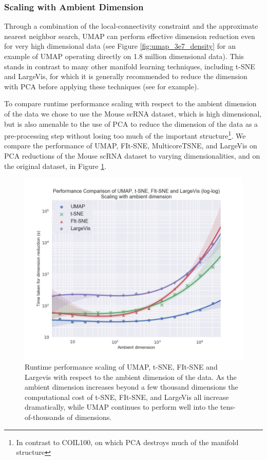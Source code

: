 \documentclass[12pt]{article}
\begin{document}
\subsubsection{Scaling with Ambient Dimension}\label{ambient_dim_scaling}

Through a combination of the local-connectivity constraint and the approximate nearest neighbor search, UMAP can perform effective dimension reduction even for very high dimensional data (see Figure \ref{fig:umap_3e7_density} for an example of UMAP operating directly on 1.8 million dimensional data). This stands in contrast to many other manifold learning techniques, including t-SNE and LargeVis, for which it is generally recommended to reduce the dimension with PCA before applying these techniques (see \cite{maaten2008visualizing} for example).

To compare runtime performance scaling with respect to the ambient dimension of the data we chose to use the Mouse scRNA dataset, which is high dimensional, but is also amenable to the use of PCA to reduce the dimension of the data as a pre-processing step without losing too much of the important structure\footnote{In contrast to COIL100, on which PCA destroys much of the manifold structure}. We compare the performance of UMAP, FIt-SNE, MulticoreTSNE, and LargeVis on PCA reductions of the Mouse scRNA dataset to varying dimensionalities, and on the original dataset, in Figure \ref{fig:ambient-dim-scaling}. 

\begin{figure}
    \centering
    \includegraphics[width=\textwidth]{performance_comparison_ambient_dim.png}
    \caption{Runtime performance scaling of UMAP, t-SNE, FIt-SNE and Largevis with respect to the ambient dimension of the data. As the ambient dimension increases beyond a few thousand dimensions the computational cost of t-SNE, FIt-SNE, and LargeVis all increase dramatically, while UMAP continues to perform well into the tens-of-thousands of dimensions.}
    \label{fig:ambient-dim-scaling}
\end{figure}
\end{document}
